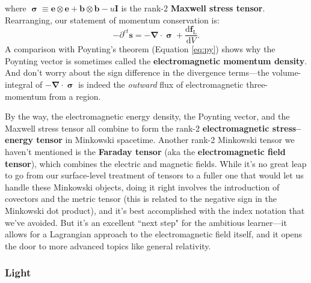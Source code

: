\documentclass[12pt]{article}
\renewcommand{\vv}[1]{\mathbf{#1}}
\newcommand{\dd}[1]{\mathrm{d}#1}
\newcommand{\vvsigma}{\bm{\upsigma}}
\newcommand{\del}{\boldsymbol{\nabla}}
\begin{document}
where $\vvsigma \equiv \vv e \otimes \vv e + \vv b \otimes \vv b - u \vv I$ is the rank-2 \textbf{Maxwell stress tensor}. Rearranging, our statement of momentum conservation is:
\begin{equation*}
- \partial^{ct} \vv s = - \del \cdot \vvsigma + \dfrac{\dd \vv f_{\mathrm{L}}}{\dd V} .
\end{equation*}
A comparison with Poynting's theorem (Equation \ref{eq:py}) shows why the Poynting vector is sometimes called the \textbf{electromagnetic momentum density}. And don't worry about the sign difference in the divergence terms---the volume-integral of $- \del \cdot \vvsigma$ is indeed the \emph{outward} flux of electromagnetic three-momentum from a region.

By the way, the electromagnetic energy density, the Poynting vector, and the Maxwell stress tensor all combine to form the rank-2 \textbf{electromagnetic stress--energy tensor} in Minkowski spacetime. Another rank-2 Minkowski tensor we haven't mentioned is the \textbf{Faraday tensor} (aka the \textbf{electromagnetic field tensor}), which combines the electric and magnetic fields. While it's no great leap to go from our surface-level treatment of tensors to a fuller one that would let us handle these Minkowski objects, doing it right involves the introduction of covectors and the metric tensor (this is related to the negative sign in the Minkowski dot product), and it's best accomplished with the index notation that we've avoided. But it's an excellent ``next step" for the ambitious learner---it allows for a Lagrangian approach to the electromagnetic field itself, and it opens the door to more advanced topics like general relativity.


\subsubsection{Light}
\end{document}
